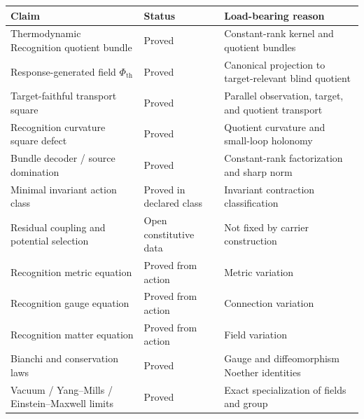 \medskip

\begin{center}
\small
\begin{tabular}{p{}p{}p{}}
\toprule
Claim & Status & Load-bearing reason\\
\midrule
Thermodynamic Recognition quotient bundle & Proved & Constant-rank kernel and quotient bundles\\
Response-generated field $\Phi_{\mathrm{th}}$ & Proved & Canonical projection to target-relevant blind quotient\\
Target-faithful transport square & Proved & Parallel observation, target, and quotient transport\\
Recognition curvature square defect & Proved & Quotient curvature and small-loop holonomy\\
Bundle decoder / source domination & Proved & Constant-rank factorization and sharp norm\\
Minimal invariant action class & Proved in declared class & Invariant contraction classification\\
Residual coupling and potential selection & Open constitutive data & Not fixed by carrier construction\\
Recognition metric equation & Proved from action & Metric variation\\
Recognition gauge equation & Proved from action & Connection variation\\
Recognition matter equation & Proved from action & Field variation\\
Bianchi and conservation laws & Proved & Gauge and diffeomorphism Noether identities\\
Vacuum / Yang--Mills / Einstein--Maxwell limits & Proved & Exact specialization of fields and group\\
\bottomrule
\end{tabular}
\end{center}

\medskip

